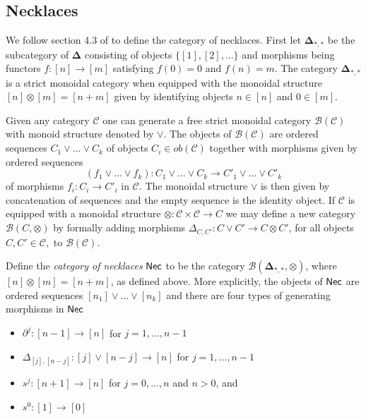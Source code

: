 \subsection{Necklaces} We follow section 4.3 of \cite{Galvez-Kaufmann-Tonks} to define the category of necklaces. First let $\mathbf{\Delta}_{*,*}$ be the subcategory of $\mathbf{\Delta}$ consisting of objects $\{ [1], [2],\dots\}$ and morphisms being functors $f \colon [n] \to [m]$ satisfying $f(0)=0$ and $f(n)=m$. The category $\mathbf{\Delta}_{*,*}$ is a strict monoidal category when equipped with the monoidal structure $[n] \otimes [m]= [n+m]$ given by identifying objects $n \in [n]$ and $0 \in [m]$.

Given any category $\mathcal{C}$ one can generate a free strict monoidal category $\mathcal{B}(\mathcal{C})$ with monoid structure denoted by $\vee$. The  objects of $\mathcal{B}(\mathcal{C})$ are ordered sequences $C_1 \vee ... \vee C_k$ of objects $C_i \in ob(\mathcal{C})$ together with morphisms given by ordered sequences $$(f_1 \vee ... \vee f_k) \colon C_1 \vee ... \vee C_k \to C'_1 \vee ... \vee C'_k$$ of morphisms $f_i \colon C_i \to C'_i$ in $\mathcal{C}.$ The monoidal structure $\vee$ is then given by concatenation of sequences and the empty sequence is the identity object. If $\mathcal{C}$ is equipped with a monoidal structure $\otimes \colon \mathcal{C} \times \mathcal{C} \to C$ we may define a new category $\mathcal{B}(C, \otimes)$ by formally adding morphisms $\Delta_{C,C'} \colon C \vee C' \to C \otimes C'$, for all objects $C, C' \in \mathcal{C},$ to $\mathcal{B}(\mathcal{C}).$
 
Define the \textit{category of necklaces} $\mathsf{Nec}$ to be the category  $\mathcal{B}(\mathbf{\Delta}_{*,*}, \otimes)$, where $[n] \otimes [m]=[n+m]$, as defined above. More explicitly, the objects of $\mathsf{Nec}$ are ordered sequences $[n_1] \vee ... \vee[n_k]$ and there are four types of generating morphisms in $\mathsf{Nec}$
\begin{itemize}
\item $\partial^j \colon [n-1] \to  [n] $
for $j=1,\dots,n-1$
\item $\Delta_{[j],[n-j]} \colon  [j]\vee [n-j] \to [n]$ for $j=1,\dots,n-1$
\item $ s^j \colon [n+1] \to [n]$ for $j=0,\dots,n$ and $n>0$, and 
\item $s^0 \colon [1] \to [0]$
\end{itemize}

